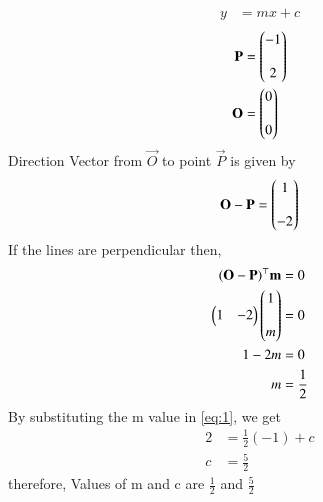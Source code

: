 \begin{align}
   y&=mx+c
 \label{eq:1}
 \end{align}
\begin{align}
  \mathbf{P}&=\begin{pmatrix}-1\\ \\2\end{pmatrix}\\
 \mathbf{O} &=\begin{pmatrix}0\\ \\ 0\end{pmatrix}
\end{align}
   Direction Vector from $\vec{O}$ to point $\vec{P}$ is given by
    \begin{align}
    \mathbf{O - P} =\begin{pmatrix}1\\ \\ -2\end{pmatrix}
 \end{align}
 If the lines are perpendicular then,
 \begin{align}
   \mathbf{(O - P)}^{\top}\mathbf{m} &= 0\\
   \begin{pmatrix}1 & -2\end{pmatrix}\begin{pmatrix}1 \\ \\ m\end{pmatrix}&=0\\
   1 - 2m &= 0\\
   m &= \frac{1}{2}
\end{align}
By substituting the m value in \eqref{eq:1},  we get
 \begin{align}
 2 &=\frac{1}{2} (-1) + c \\
 c &=\frac{5}{2}  
\end{align}
therefore,  Values of m and c are $\frac{1}{2}$ and $\frac{5}{2}$ \\
%
